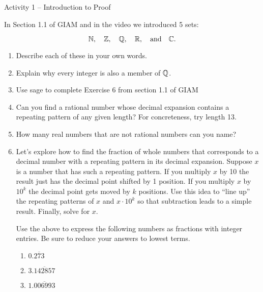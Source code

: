 \documentclass{amsart}
\begin{document}
\thispagestyle{empty}

\centerline{\Large Activity 1 -- Introduction to Proof}
\bigskip
\Large

In Section 1.1 of GIAM and in the video we introduced 5 sets:

\[ {\mathbb N}, \quad {\mathbb Z}, \quad {\mathbb Q}, \quad {\mathbb R}, \quad \mbox{and} \quad {\mathbb C}. \]

\begin{enumerate}
\item Describe each of these in your own words.

\vfill

\item Explain why every integer is also a member of ${\mathbb Q}$.

\vfill

\newpage

\item Use sage to complete Exercise 6 from section 1.1 of GIAM

\vfill

\item Can you find a rational number whose decimal expansion contains a repeating pattern of any given length?  For concreteness, try length 13.

\vfill

\newpage

\item How many real numbers that are not rational numbers can you name?

\vfill

\item Let's explore how to find the fraction of whole numbers that corresponds to a decimal number with a repeating pattern in its decimal expansion.
Suppose $x$ is a number that has such a repeating pattern.  If you multiply $x$ by 10 the result just has the decimal point shifted by 1 position.  If you multiply $x$ by $10^k$ the decimal point gets moved by $k$ positions.  Use this idea to ``line up'' the repeating patterns of $x$ and $x \cdot 10^k$ so that subtraction leads to a simple result.  Finally, solve for $x$.

Use the above to express the following numbers as fractions with integer entries.  Be sure to reduce your answers to lowest terms.

\begin{enumerate}
\item \rule{0pt}{36pt} $0.\overline{273}$ 
\item \rule{0pt}{36pt} $3.\overline{142857}$ 
\item \rule{0pt}{36pt} $1.\overline{006993}$ 
\end{enumerate}


\end{enumerate}
\end{document}
